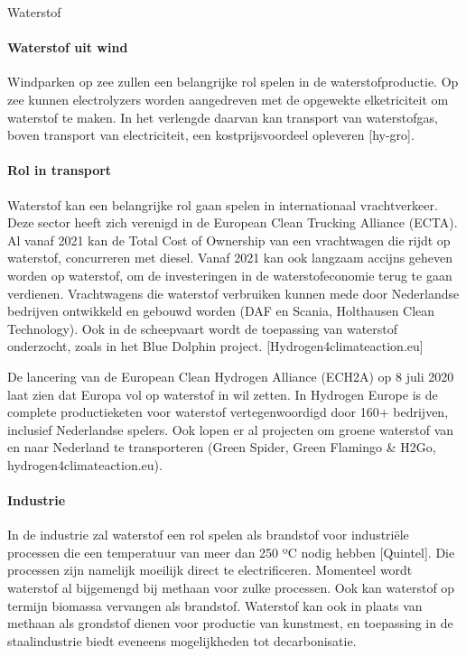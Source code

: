 \begin{voorstel}{Waterstof}
\begin{multicols*}{2}
\begin{overwegingen}
\paragraph{Waterstof uit wind}
Windparken op zee zullen een belangrijke rol spelen in de waterstofproductie. Op zee kunnen electrolyzers worden aangedreven met de opgewekte elketriciteit om waterstof te maken. In het verlengde daarvan kan transport van waterstofgas, boven transport van electriciteit, een kostprijsvoordeel opleveren [hy-gro].

\paragraph{Rol in transport}
Waterstof kan een belangrijke rol gaan spelen in internationaal vrachtverkeer. Deze sector heeft zich verenigd in de European Clean Trucking Alliance (ECTA). Al vanaf 2021 kan de Total Cost of Ownership van een vrachtwagen die rijdt op waterstof, concurreren met diesel. Vanaf 2021 kan ook langzaam accijns geheven worden op waterstof, om de investeringen in de waterstofeconomie terug te gaan verdienen. Vrachtwagens die waterstof verbruiken kunnen mede door Nederlandse bedrijven ontwikkeld en gebouwd worden (DAF en Scania, Holthausen Clean Technology). Ook in de scheepvaart wordt de toepassing van waterstof onderzocht, zoals in het Blue Dolphin project. [Hydrogen4climateaction.eu]

De lancering van de European Clean Hydrogen Alliance (ECH2A) op 8 juli 2020 laat zien dat Europa vol op waterstof in wil zetten. In Hydrogen Europe is de complete productieketen voor waterstof vertegenwoordigd door 160+ bedrijven, inclusief Nederlandse spelers. Ook lopen er al projecten om groene waterstof van en naar Nederland te transporteren (Green Spider, Green Flamingo \& H2Go, hydrogen4climateaction.eu).

\paragraph{Industrie}
In de industrie zal waterstof een rol spelen als brandstof voor industriële processen die een temperatuur van meer dan 250 ºC nodig hebben [Quintel]. Die processen zijn namelijk moeilijk direct te electrificeren. Momenteel wordt waterstof al bijgemengd bij methaan voor zulke processen. Ook kan waterstof op termijn biomassa vervangen als brandstof. Waterstof kan ook in plaats van methaan als grondstof dienen voor productie van kunstmest, en toepassing in de staalindustrie biedt eveneens mogelijkheden tot decarbonisatie.


\end{overwegingen}
\end{multicols*}
\end{voorstel}
